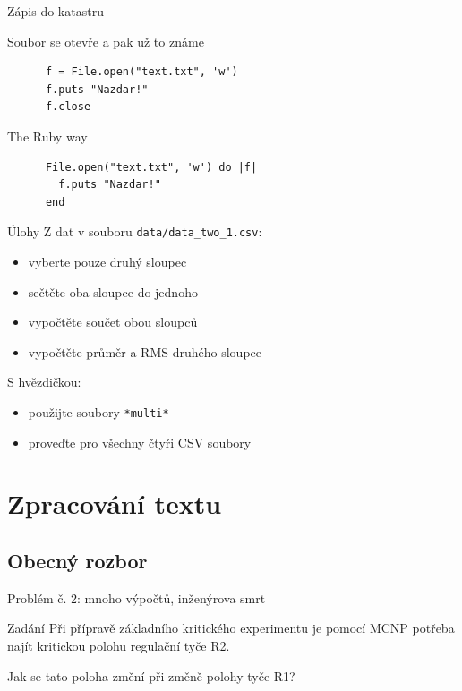 \documentclass{beamer}
\begin{document}
\begin{frame}[fragile]{Zápis do katastru}
  \begin{block}{Soubor se otevře a pak už to známe}
    \begin{verbatim}
      f = File.open("text.txt", 'w')
      f.puts "Nazdar!"
      f.close
    \end{verbatim}
  \end{block}
  \pause
  \begin{block}{The Ruby way}
    \begin{verbatim}
      File.open("text.txt", 'w') do |f|
        f.puts "Nazdar!"
      end
    \end{verbatim}
  \end{block}
\end{frame}

\begin{frame}{Úlohy}
  Z dat v souboru \texttt{data/data\_two\_1.csv}:
  \begin{itemize}
    \item vyberte pouze druhý sloupec
    \item sečtěte oba sloupce do jednoho
    \item vypočtěte součet obou sloupců
    \item vypočtěte průměr a RMS druhého sloupce
  \end{itemize}
  S hvězdičkou:
  \begin{itemize}
    \item použijte soubory \texttt{*multi*}
    \item proveďte pro všechny čtyři CSV soubory
  \end{itemize}
\end{frame}

\section{Zpracování textu}

\subsection{Obecný rozbor}

\begin{frame}{Problém č. 2: mnoho výpočtů, inženýrova smrt}
  \begin{block}{Zadání}
    Při přípravě základního kritického experimentu je pomocí MCNP potřeba najít kritickou polohu regulační tyče R2.

    Jak se tato poloha změní při změně polohy tyče R1?
  \end{block}
\end{frame}
\end{document}
